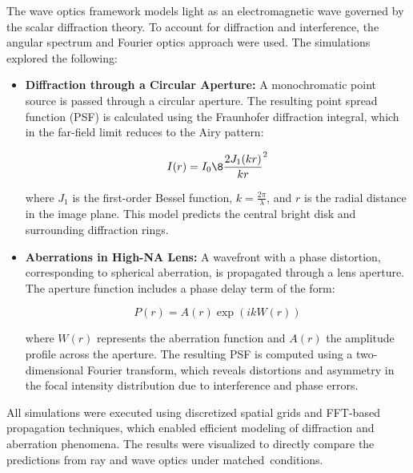 \begin{multicols}{2}
The wave optics framework models light as an electromagnetic wave governed by the scalar diffraction theory. 
To account for diffraction and interference, the angular spectrum and Fourier optics approach were used. 
The simulations explored the following:

\begin{itemize}
\item \textbf{Diffraction through a Circular Aperture:} A monochromatic point source is passed through a circular aperture. The resulting point spread function (PSF) is calculated using the Fraunhofer diffraction integral, which in the far-field limit reduces to the Airy pattern:

\[
I(r) = I_0 \8{\frac{2J_1(kr)}{kr}}^2
\]

where $J_1$ is the first-order Bessel function, $k = \frac{2\pi}{\lambda}$, and $r$ is the radial distance in the image plane. 
This model predicts the central bright disk and surrounding diffraction rings.

\item \textbf{Aberrations in High-NA Lens:} A wavefront with a phase distortion, corresponding to spherical aberration, is propagated through a lens aperture. The aperture function includes a phase delay term of the form:

\[
P(r) = A(r) \exp\left(i k W(r)\right)     
\]

where $W(r)$ represents the aberration function and $A(r)$ the amplitude profile across the aperture. The resulting PSF is computed using a two-dimensional Fourier transform, which reveals distortions and asymmetry in the focal intensity distribution due to interference and phase errors.
\end{itemize}

All simulations were executed using discretized spatial grids and FFT-based propagation techniques, which enabled efficient modeling of diffraction and aberration phenomena. The results were visualized to directly compare the predictions from ray and wave optics under matched conditions.
\end{multicols}
